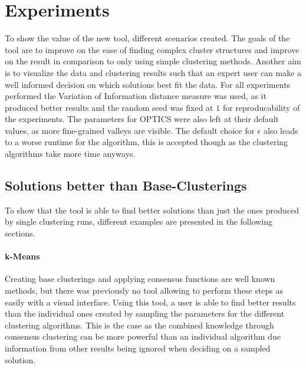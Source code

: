 \documentclass[
	a4paper,
	english,
	twoside,
	openright,               
	11pt                            
	]{report}
\begin{document}
\chapter{Experiments}\label{cha:experiments}
To show the value of the new tool, different scenarios created. The goals of the tool are to improve on the ease of finding complex cluster structures and improve on the result in comparison to only using simple clustering methods. Another aim is to visualize the data and clustering results such that an expert user can make a well informed decision on which solutions best fit the data. For all experiments performed the Variation of Information distance measure was used, as it produced better results and the random seed was fixed at $1$ for reproducability of the experiments. The parameters for OPTICS were also left at their default values, as more fine-grained valleys are visible. The default choice for $\epsilon$ also leads to a worse runtime for the algorithm, this is accepted though as the clustering algorithms take more time anyways.

\section{Solutions better than Base-Clusterings}
To show that the tool is able to find better solutions than just the ones produced by single clustering runs, different examples are presented in the following sections. 
\subsubsection{k-Means}
Creating base clusterings and applying consensus functions are well known methods, but there was previously no tool allowing to perform these steps as easily with a visual interface. Using this tool, a user is able to find better results than the individual ones created by sampling the parameters for the different clustering algorithms. This is the case as the combined knowledge through consensus clustering can be more powerful than an individual algorithm due information from other results being ignored when deciding on a sampled solution.
\end{document}
